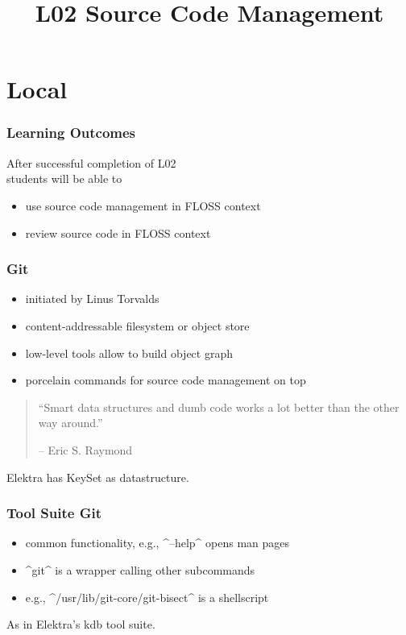 

\title{L02 Source Code Management}



\section{Local}

\begin{frame}[label=learning outcome]
	\frametitle{Learning Outcomes}
	After successful completion of L02 \\
	students will be able to

	\begin{itemize}
	\item use source code management in FLOSS context
	\item review source code in FLOSS context
	\end{itemize}
\end{frame}

\begin{frame}
	\frametitle{Git}

	\begin{itemize}
		\item initiated by Linus Torvalds
		\item content-addressable filesystem or object store
		\item low-level tools allow to build object graph
		\item porcelain commands for source code management on top
	\end{itemize}
	\vspace{1cm}

	\begin{quote}
	``Smart data structures and dumb code works a lot better than the other way around.''

	-- Eric S. Raymond
	\end{quote}
	\vspace{1cm}

	Elektra has KeySet as datastructure.
\end{frame}

\begin{frame}[fragile]
	\frametitle{Tool Suite Git}

	\begin{itemize}
		\item common functionality, e.g., ^--help^ opens man pages
		\item ^git^ is a wrapper calling other subcommands
		\item e.g., ^/usr/lib/git-core/git-bisect^ is a shellscript
	\end{itemize}
	\vspace{1cm}

	As in Elektra's kdb tool suite.
\end{frame}

